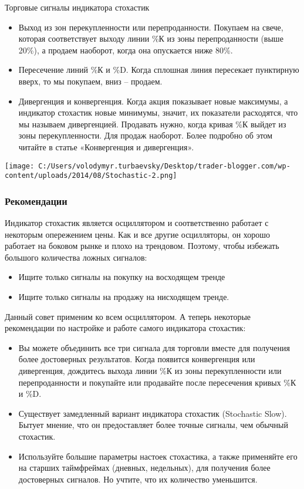 \documentclass[a5paper]{article}
\begin{document}
Торговые сигналы индикатора стохастик
\begin{itemize}
\item     Выход из зон перекупленности или перепроданности. Покупаем на свече, которая соответствует выходу линии \%К из зоны перепроданности (выше 20\%), а продаем наоборот, когда она опускается ниже 80\%.
\item     Пересечение линий \%К и \%D. Когда сплошная линия пересекает пунктирную вверх, то мы покупаем, вниз – продаем.
\item     Дивергенция и конвергенция. Когда акция показывает новые максимумы, а индикатор стохастик новые минимумы, значит, их показатели расходятся, что мы называем дивергенцией. Продавать нужно, когда кривая \%К выйдет из зоны перекупленности. Для продаж наоборот. Более подробно об этом читайте в статье «Конвергенция и дивергенция».
\end{itemize}

\texttt{[image: C:/Users/volodymyr.turbaevsky/Desktop/trader-blogger.com/wp-content/uploads/2014/08/Stochastic-2.png]}

\subsubsection{Рекомендации}

Индикатор стохастик является осциллятором и соответственно работает с некоторым опережением цены. Как и все другие осцилляторы, он хорошо работает на боковом рынке и плохо на трендовом. Поэтому, чтобы избежать большого количества ложных сигналов:
\begin{itemize}
\item     Ищите только сигналы на покупку на восходящем тренде
\item     Ищите только сигналы на продажу на нисходящем тренде.
\end{itemize}

Данный совет применим ко всем осциллятором. А теперь некоторые рекомендации по настройке и работе самого индикатора стохастик:
\begin{itemize}
\item     Вы можете объединить все три сигнала для торговли вместе для получения более достоверных результатов. Когда появится конвергенция или дивергенция, дождитесь выхода линии \%К из зоны перекупленности или перепроданности и покупайте или продавайте после пересечения кривых \%К и \%D.
\item     Существует замедленный вариант индикатора стохастик (Stochastic Slow). Бытует мнение, что он предоставляет более точные сигналы, чем обычный стохастик.
\item     Используйте большие параметры настоек стохастика, а также применяйте его на старших таймфреймах (дневных, недельных), для получения более достоверных сигналов. Но учтите, что их количество уменьшится.
\end{itemize}
\end{document}
